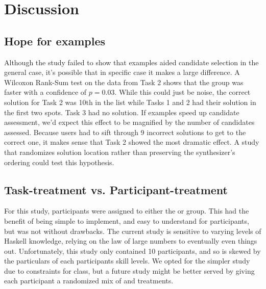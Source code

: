 \section{Discussion}
\label{sec:discussion}

\subsection{Hope for examples}
Although the study failed to show that examples aided candidate selection in
the general case, it's possible that in specific case it makes a large difference.
%
A Wilcoxon Rank-Sum test on the data from Task 2 shows that the \examples
group was faster with a confidence of $p=0.03$.
%
While this could just be noise, the correct solution for Task 2 was 10th in
the list while Tasks 1 and 2 had their solution in the first two spots.
%
Task 3 had no solution.
%
If examples speed up candidate assessment, we'd expect this effect to be
magnified by the number of candidates assessed.
%
Because users had to sift through 9 incorrect solutions to get to the correct
one, it makes sense that Task 2 showed the most dramatic effect.
%
A study that randomizes solution location rather than preserving the synthesizer's ordering
could test this hypothesis.

\subsection{Task-treatment vs. Participant-treatment}
For this study, participants were assigned to either the \examples or
\noexamples group.
%
This had the benefit of being simple to implement, and easy to understand for
participants, but was not without drawbacks.
%
The current study is sensitive to varying levels of Haskell knowledge, relying on
the law of large numbers to eventually even things out.
%
Unfortunately, this study only contained 10 participants, and so is skewed by
the particulars of each participants skill levels.
%
We opted for the simpler study due to constraints for class, but a future
study might be better served by giving each participant a randomized mix of \examples
and \noexamples treatments.
